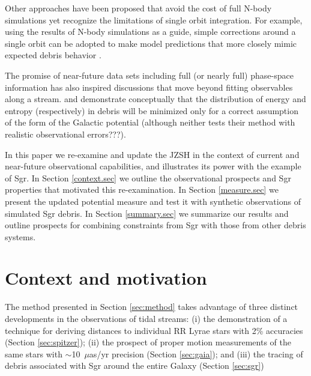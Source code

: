 \documentclass[preprint]{aastex}
\begin{document}
Other approaches have been proposed that avoid the cost of full N-body simulations yet recognize the limitations of single orbit integration.
For example, using the results of N-body simulations as a guide, simple corrections around a single orbit can be adopted to make model predictions that more closely
mimic expected debris behavior \citep[e.g.][]{johnston99a,varghese2011}.

The promise of near-future data sets including full (or nearly full) phase-space information has also inspired discussions that move beyond fitting observables along a
stream.
\citet{binney08} and \citet{penarrubia12} demonstrate conceptually that the distribution of energy and entropy (respectively) in debris will be minimized only for a correct
assumption of the form of the Galactic potential (although neither tests their method with realistic observational errors???).

In this paper we re-examine and update  the JZSH  in the context of current and near-future observational capabilities, and illustrates its power with the example of Sgr.
In Section \ref{context.sec} we outline the observational prospects and Sgr properties that motivated this re-examination.
In Section \ref{measure.sec} we present the updated potential measure and test it with synthetic observations of simulated Sgr debris.
In Section \ref{summary.sec} we summarize our results and outline prospects for combining constraints from Sgr with those from other debris systems.


%

\section{Context and motivation}
The method presented in Section \ref{sec:method} takes advantage of
three distinct developments in the observations of tidal streams: (i)
the demonstration of a technique for deriving distances to individual
RR Lyrae stars with 2\% accuracies (Section \ref{sec:spitzer}); (ii)
the prospect of proper motion measurements of the same stars with
$\sim$10~$\mu$as/yr precision (Section \ref{sec:gaia}); and (iii) the
tracing of debris associated with Sgr around the entire Galaxy
(Section \ref{sec:sgr})
\end{document}
